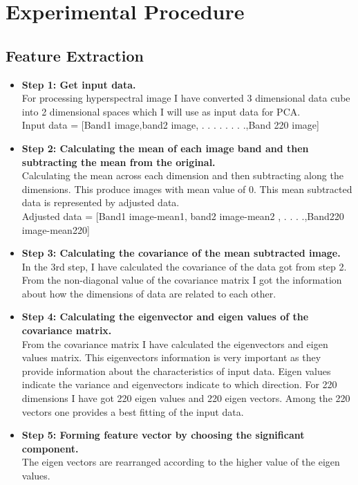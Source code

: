 \documentclass[document.tex]{subfiles}
\begin{document}
\section{Experimental Procedure}

\subsection{Feature Extraction}
\begin{itemize}
	\item \textbf{Step 1: Get input data. }\\
	For processing hyperspectral image I have converted 3 dimensional data cube into 2 dimensional spaces which I will use
	as input data for PCA.\\
	Input data = [Band1 image,band2 image, . . . . . . . .,Band 220 image]
	\item \textbf{Step 2: Calculating the mean of each image band and then subtracting
		the mean from the original.}\\
	Calculating the mean across each dimension and then subtracting along the dimensions. This produce images with mean value of 0. This mean subtracted data is
	represented by adjusted data.\\ Adjusted data = [Band1 image-mean1, band2 image-mean2 , . . . .,Band220 image-mean220]
	\item \textbf{Step 3: Calculating the covariance of the mean subtracted image.} \\
	In the 3rd step, I have calculated the covariance of the data got from step 2. From
	the non-diagonal value of the covariance matrix I got the information about how
	the dimensions of data are related to each other.
	\item \textbf{Step 4: Calculating the eigenvector and eigen values of the covariance matrix.} \\
	From the covariance matrix I have calculated the eigenvectors and eigen values
	matrix. This eigenvectors information is very important as they provide information
	about the characteristics of input data. Eigen values indicate the variance and
	eigenvectors indicate to which direction. For 220 dimensions I have got 220 eigen
	values and 220 eigen vectors. Among the 220 vectors one provides a best fitting of
	the input data.
	\item \textbf{Step 5: Forming feature vector by choosing the significant component.}\\
	The eigen vectors are rearranged according to the higher value of the eigen values.

\end{itemize}
\end{document}

